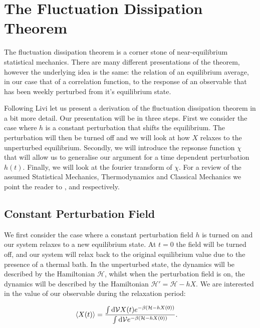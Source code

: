 \section{The Fluctuation Dissipation Theorem}

The fluctuation dissipation theorem is a corner stone of near-equilibrium statistical mechanics. There are many different presentations of the theorem, however the underlying idea is the same: the relation of an equilibrium average, in our case that of a correlation function, to the response of an observable that has been weekly perturbed from it's equilibrium state.

Following Livi \cite{LiviPoliti2017} let us present a derivation of the fluctuation dissipation theorem in a bit more detail. Our presentation will be in three steps. First we consider the case where $h$ is a constant perturbation that shifts the equilibrium. The perturbation will then be turned off and we will look at how $X$ relaxes to the unperturbed equilibrium. Secondly, we will introduce the repsonse function $\chi$ that will allow us to generalise our argument for a time dependent perturbation $h(t)$. Finally, we will look at the fourier transform of $\chi$. For a review of the assumed Statistical Mechanics, Thermodynamics and Classical Mechanics we point the reader to \cite{Greiner1995}, \cite{JudithA.McGovern2016} and \cite{JohnBaez} respectively.\\

\subsection{Constant Perturbation Field}

We first consider the case where a constant perturbation field $h$ is turned on and our system relaxes to a new equilibrium state. At $t = 0$ the field will be turned off, and our system will relax back to the original equilibrium value due to the presence of a thermal bath. In the unperturbed state, the dynamics will be described by the Hamiltonian $\mathcal{H}$, whilst when the perturbation field is on, the dynamics will be described by the Hamiltonian $\mathcal{H}' = \mathcal{H} -hX$. We are interested in the value of our observable during the relaxation period:

\begin{align}
\expval{X(t)} &= \frac{\int \dd \mathcal{V} X(t) e^{-\beta \left( \mathcal{H}-hX(0) \right) }  }{\int \dd \mathcal{V} e^{-\beta \left( \mathcal{H}-hX(0) \right) }}. \label{relaxVal}
\end{align}

